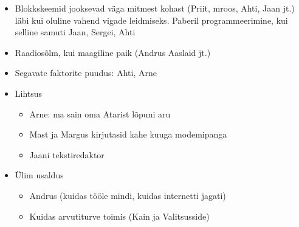 \documentclass{tufte-book}
\begin{document}
\begin{itemize}
	\item Blokkskeemid jooksevad väga mitmest kohast (Priit, mroos, Ahti, Jaan jt.) läbi kui oluline vahend vigade leidmiseks. Paberil programmeerimine, kui selline samuti Jaan, Sergei, Ahti
	\item Raadiosõlm, kui maagiline paik (Andrus Aaslaid jt.)
	\item Segavate faktorite puudus: Ahti, Arne
	\item Lihtsus
	\begin{itemize}
		\item Arne: ma sain oma Atarist lõpuni aru
		\item Mast ja Margus kirjutasid kahe kuuga modemipanga
		\item Jaani tekstiredaktor
	\end{itemize}
	\item Ülim usaldus
	\begin{itemize}
		\item Andrus (kuidas tööle mindi, kuidas internetti jagati)
		\item Kuidas arvutiturve toimis (Kain ja Valitsusside)
	\end{itemize}
\end{itemize}




\backmatter





\printindex[ppl]
\printindex
\end{document}
